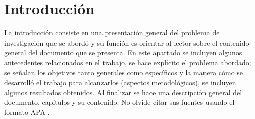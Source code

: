 \chapter{Introducción}



La introducción consiste en una presentación general del problema de 
investigación que se abordó y su función es orientar al lector sobre 
el contenido general del documento que se presenta. En este apartado 
se incluyen algunos antecedentes relacionados en el trabajo, se hace 
explícito el problema abordado; se señalan los objetivos tanto generales 
como específicos y la manera cómo se desarrolló el trabajo para 
alcanzarlos (aspectos metodológicos), se incluyen algunos resultados 
obtenidos. Al finalizar se hace una descripción general del documento, 
capítulos y su contenido. No olvide citar sus fuentes usando el formato 
\gls{APA} \cite{style2020apa}.
